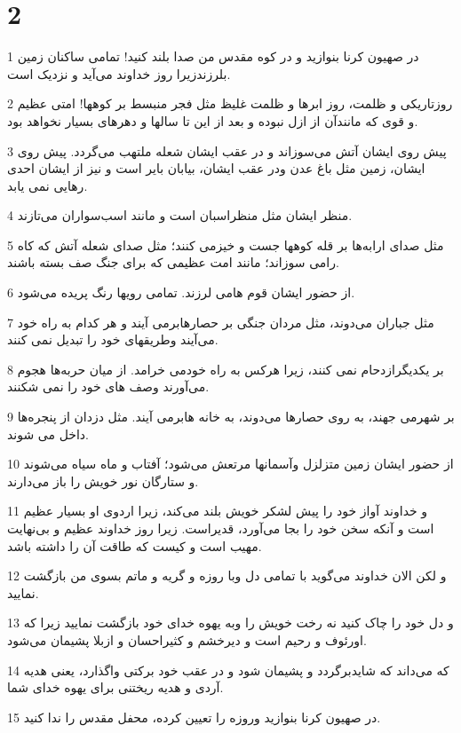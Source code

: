 \chapter{2}

\par 1 در صهیون کرنا بنوازید و در کوه مقدس من صدا بلند کنید! تمامی ساکنان زمین بلرزندزیرا روز خداوند می‌آید و نزدیک است.
\par 2 روزتاریکی و ظلمت، روز ابرها و ظلمت غلیظ مثل فجر منبسط بر کوهها! امتی عظیم و قوی که مانندآن از ازل نبوده و بعد از این تا سالها و دهرهای بسیار نخواهد بود.
\par 3 پیش روی ایشان آتش می‌سوزاند و در عقب ایشان شعله ملتهب می‌گردد. پیش روی ایشان، زمین مثل باغ عدن ودر عقب ایشان، بیابان بایر است و نیز از ایشان احدی رهایی نمی یابد.
\par 4 منظر ایشان مثل منظراسبان است و مانند اسب‌سواران می‌تازند.
\par 5 مثل صدای ارابه‌ها بر قله کوهها جست و خیزمی کنند؛ مثل صدای شعله آتش که کاه رامی سوزاند؛ مانند امت عظیمی که برای جنگ صف بسته باشند.
\par 6 از حضور ایشان قوم هامی لرزند. تمامی رویها رنگ پریده می‌شود.
\par 7 مثل جباران می‌دوند، مثل مردان جنگی بر حصارهابرمی آیند و هر کدام به راه خود می‌آیند وطریقهای خود را تبدیل نمی کنند.
\par 8 بر یکدیگرازدحام نمی کنند، زیرا هرکس به راه خودمی خرامد. از میان حربه‌ها هجوم می‌آورند وصف های خود را نمی شکنند.
\par 9 بر شهرمی جهند، به روی حصارها می‌دوند، به خانه هابرمی آیند. مثل دزدان از پنجره‌ها داخل می شوند.
\par 10 از حضور ایشان زمین متزلزل وآسمانها مرتعش می‌شود؛ آفتاب و ماه سیاه می‌شوند و ستارگان نور خویش را باز می‌دارند.
\par 11 و خداوند آواز خود را پیش لشکر خویش بلند می‌کند، زیرا اردوی او بسیار عظیم است و آنکه سخن خود را بجا می‌آورد، قدیراست. زیرا روز خداوند عظیم و بی‌نهایت مهیب است و کیست که طاقت آن را داشته باشد.
\par 12 و لکن الان خداوند می‌گوید با تمامی دل وبا روزه و گریه و ماتم بسوی من بازگشت نمایید.
\par 13 و دل خود را چاک کنید نه رخت خویش را وبه یهوه خدای خود بازگشت نمایید زیرا که اورئوف و رحیم است و دیرخشم و کثیراحسان و ازبلا پشیمان می‌شود.
\par 14 که می‌داند که شایدبرگردد و پشیمان شود و در عقب خود برکتی واگذارد، یعنی هدیه آردی و هدیه ریختنی برای یهوه خدای شما.
\par 15 در صهیون کرنا بنوازید وروزه را تعیین کرده، محفل مقدس را ندا کنید.
